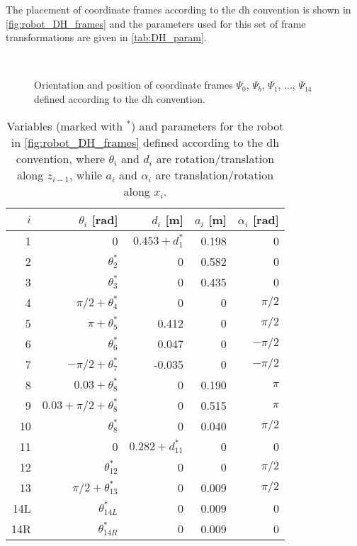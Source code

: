 The placement of coordinate frames according to the \gls{dh} convention is shown in \autoref{fig:robot_DH_frames} and the parameters used for this set of frame transformations are given in \autoref{tab:DH_param}.


\begin{figure}[htbp]
	\vspace*{-10mm}
	\hspace{-10mm}
	\vspace{5mm}\\
	\hspace*{-15mm}
	\caption{Orientation and position of coordinate frames $\Psi_0$, $\Psi_b$, $\Psi_1$, ..., $\Psi_{14}$ defined according to the \gls{dh} convention.}
	\label{fig:robot_DH_frames}
\end{figure}

\begin{table}[htbp]
	\small
	\vspace*{-3mm}
	\centering
	\begin{tabular}{r | rrrr}\hline
		$i$  & $\theta_i$ [rad]& $d_i$ [m] & $a_i$ [m] & $\alpha_i$ [rad] \\\hline
		1 & 0 &  $0.453+d_1^*$ & 0.198 & 0 \\
		2 & $\theta_2^*$ & 0 & 0.582 & 0 \\
		3 & $\theta_3^*$ & 0 & 0.435 & 0\\
		4 & $\pi/2+\theta_4^*$ & 0 & 0 & $\pi/2$\\
		5 & $\pi+\theta_5^*$ & 0.412 & 0 & $\pi/2$ \\
		6 & $\theta_6^*$ & 0.047 & 0 & $-\pi/2$ \\
		7 & $-\pi/2+\theta_7^*$ & -0.035 & 0 & $-\pi/2$ \\
		8 & $0.03+\theta_8^*$ & 0 & 0.190 & $\pi$ \\
		9 & $0.03+\pi/2+\theta_8^*$ & 0 & 0.515 & $\pi$ \\
		10 & $\theta_8^*$ & 0 & 0.040 & $\pi/2$\\
		11 & 0 & $0.282+d_{11}^*$ & 0  & 0 \\
		12 & $\theta_{12}^*$ & 0 & 0 & $\pi/2$ \\
		13 & $\pi/2+\theta_{13}^*$ & 0 & 0.009 & $\pi/2$ \\
		14L & $\theta_{14L}^*$ & 0 & 0.009 & 0\\
		14R & $\theta_{14R}^*$ & 0 & 0.009 & 0 \\
	\end{tabular}
	\caption{Variables (marked with $^*$) and parameters for the robot in \autoref{fig:robot_DH_frames} defined according to the \gls{dh} convention, where $\theta_i$ and $d_i$ are rotation/translation along $z_{i-1}$, while $a_i$ and $\alpha_i$ are translation/rotation along $x_i$.}
	\label{tab:DH_param}
\end{table}

